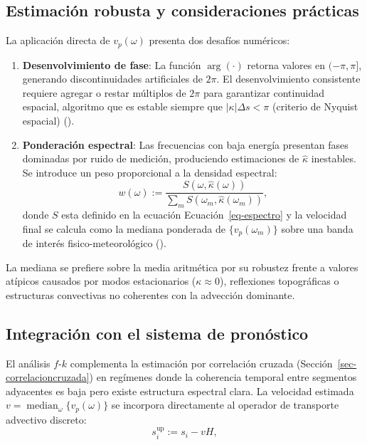 \documentclass[
  spanish,
  us-letterpaper,
]{scrreprt}
\providecommand{\tightlist}{%
  \setlength{\itemsep}{0pt}\setlength{\parskip}{0pt}}
\numberwithin{equation}{section}
\begin{document}
\subsection{Estimación robusta y consideraciones
prácticas}\label{estimaciuxf3n-robusta-y-consideraciones-pruxe1cticas}

La aplicación directa de \(v_p(\omega)\) presenta dos desafíos
numéricos:

\begin{enumerate}
\def\labelenumi{\arabic{enumi}.}
\tightlist
\item
  \textbf{Desenvolvimiento de fase}: La función \(\arg(\cdot)\) retorna
  valores en \((-\pi, \pi]\), generando discontinuidades artificiales de
  \(2\pi\). El desenvolvimiento consistente requiere agregar o restar
  múltiplos de \(2\pi\) para garantizar continuidad espacial, algoritmo
  que es estable siempre que \(|\kappa| \Delta s < \pi\) (criterio de
  Nyquist espacial) ().
\item
  \textbf{Ponderación espectral}: Las frecuencias con baja energía
  presentan fases dominadas por ruido de medición, produciendo
  estimaciones de \(\hat{\kappa}\) inestables. Se introduce un peso
  proporcional a la densidad espectral: \[
  w(\omega) := \frac{S(\omega, \hat{\kappa}(\omega))}{\sum_{m} S(\omega_m, \hat{\kappa}(\omega_m))},
  \] donde \(S\) esta definido en la ecuación Ecuación~\ref{eq-espectro}
  y la velocidad final se calcula como la mediana ponderada de
  \(\{v_p(\omega_m)\}\) sobre una banda de interés fisico-meteorológico
  ().
\end{enumerate}

La mediana se prefiere sobre la media aritmética por su robustez frente
a valores atípicos causados por modos estacionarios
(\(\kappa \approx 0\)), reflexiones topográficas o estructuras
convectivas no coherentes con la advección dominante.

\subsection{Integración con el sistema de
pronóstico}\label{integraciuxf3n-con-el-sistema-de-pronuxf3stico-1}

El análisis \(f\)-\(k\) complementa la estimación por correlación
cruzada (Sección~\ref{sec-correlacioncruzada}) en regímenes donde la
coherencia temporal entre segmentos adyacentes es baja pero existe
estructura espectral clara. La velocidad estimada
\(v = \operatorname{median}_{\omega}\{v_p(\omega)\}\) se incorpora
directamente al operador de transporte advectivo discreto: \[
s_i^{\text{up}} := s_i - v H,
\]
\end{document}

